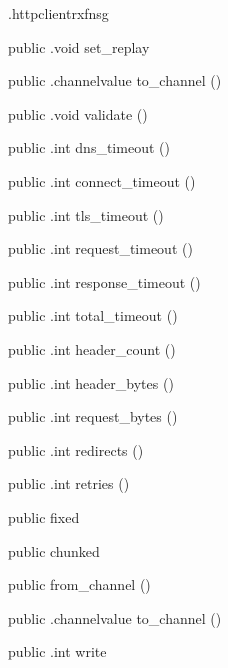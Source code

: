 \begin{CrexxClass}{.httpclient}{rxfnsg}
\begin{Members}
    \Method
      {public}
      {.void}
      {set\_replay}
      {}

    \Method
      {public}
      {.channelvalue}
      {to\_channel}
      {()}

    \Method
      {public}
      {.void}
      {validate}
      {()}

    \Method
      {public}
      {.int}
      {dns\_timeout}
      {()}

    \Method
      {public}
      {.int}
      {connect\_timeout}
      {()}

    \Method
      {public}
      {.int}
      {tls\_timeout}
      {()}

    \Method
      {public}
      {.int}
      {request\_timeout}
      {()}

    \Method
      {public}
      {.int}
      {response\_timeout}
      {()}

    \Method
      {public}
      {.int}
      {total\_timeout}
      {()}

    \Method
      {public}
      {.int}
      {header\_count}
      {()}

    \Method
      {public}
      {.int}
      {header\_bytes}
      {()}

    \Method
      {public}
      {.int}
      {request\_bytes}
      {()}

    \Method
      {public}
      {.int}
      {redirects}
      {()}

    \Method
      {public}
      {.int}
      {retries}
      {()}

    \Factory
      {public}
      {fixed}
      {}

    \Factory
      {public}
      {chunked}
      {}

    \Factory
      {public}
      {from\_channel}
      {()}

    \Method
      {public}
      {.channelvalue}
      {to\_channel}
      {()}

    \Method
      {public}
      {.int}
      {write}
      {}


\end{Members}
\end{CrexxClass}
